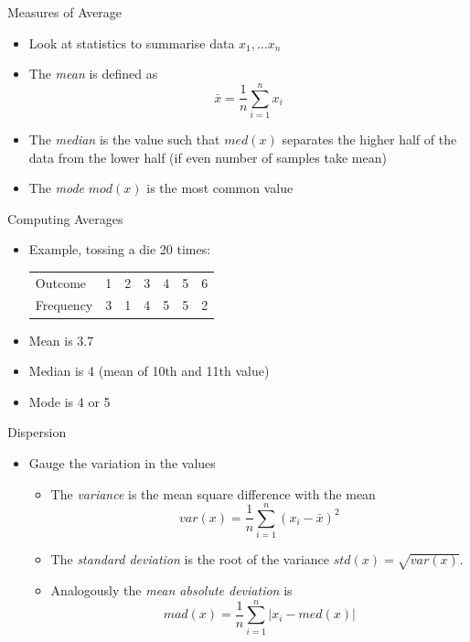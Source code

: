 \documentclass{beamer}
\begin{document}
\begin{frame}{Measures of Average}
\begin{itemize} 
 \item Look at statistics to summarise data $x_1, \ldots x_n$
  \item The \emph{mean} is defined as 
  \begin{displaymath}
   \bar{x} = \frac{1}{n}\sum_{i=1}^n x_i
  \end{displaymath}
\item The \emph{median} is the value such that $med(x)$ separates the higher half of the data from the lower half (if even number of samples take mean) 
\item The \emph{mode} $mod(x)$ is the most common value  
\end{itemize}
\end{frame}

\begin{frame}{Computing Averages} 
 \begin{itemize} 
  \item Example, tossing a die 20 times: 
\begin{table}
  \begin{tabular}{l | l l l l l l }
\hline 
  Outcome & 1 & 2 & 3 & 4 & 5 & 6 \\ 
  Frequency & 3 & 1 & 4 & 5 & 5 & 2 \\
\hline 
  \end{tabular} 
\end{table}
  \item Mean is 3.7 
  \item Median is 4 (mean of 10th and 11th value)
  \item Mode is 4 or 5 
 \end{itemize}
\end{frame}

\begin{frame}{Dispersion}  
\begin{itemize} 
 \item Gauge the variation in the values 
\begin{itemize} 
\item The \emph{variance} is the mean square difference with the mean 
\begin{displaymath} 
 var(x) = \frac{1}{n}\sum_{i=1}^n (x_i - \bar{x})^2
\end{displaymath}
 \item The \emph{standard deviation} is the root of the variance $std(x) = \sqrt{var(x)}$. 
\item Analogously the \emph{mean absolute deviation} is 
\begin{displaymath} 
  mad(x) = \frac{1}{n}\sum_{i=1}^n |x_i - med(x)|
\end{displaymath}
\end{itemize}
\end{itemize}
\end{frame}
\end{document}
